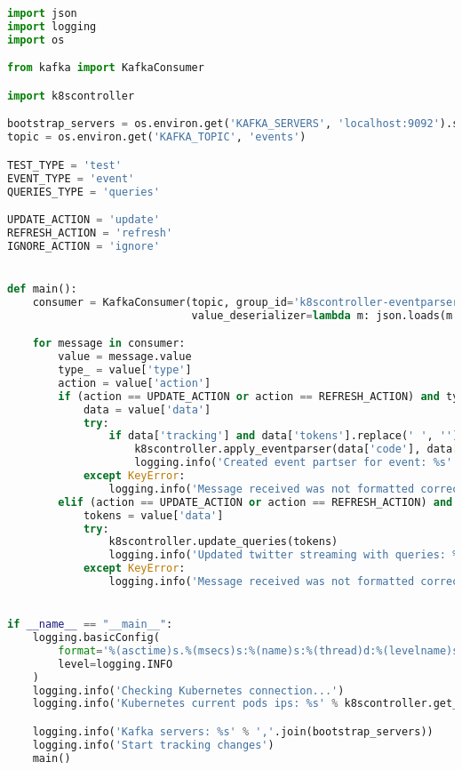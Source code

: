 \begin{lstlisting}[language=Python]
import json
import logging
import os

from kafka import KafkaConsumer

import k8scontroller

bootstrap_servers = os.environ.get('KAFKA_SERVERS', 'localhost:9092').split(',')
topic = os.environ.get('KAFKA_TOPIC', 'events')

TEST_TYPE = 'test'
EVENT_TYPE = 'event'
QUERIES_TYPE = 'queries'

UPDATE_ACTION = 'update'
REFRESH_ACTION = 'refresh'
IGNORE_ACTION = 'ignore'


def main():
    consumer = KafkaConsumer(topic, group_id='k8scontroller-eventparser', bootstrap_servers=bootstrap_servers,
                             value_deserializer=lambda m: json.loads(m.decode('utf-8')))

    for message in consumer:
        value = message.value
        type_ = value['type']
        action = value['action']
        if (action == UPDATE_ACTION or action == REFRESH_ACTION) and type_ == EVENT_TYPE:
            data = value['data']
            try:
                if data['tracking'] and data['tokens'].replace(' ', '').replace(',', ''):
                    k8scontroller.apply_eventparser(data['code'], data['tokens'])
                    logging.info('Created event partser for event: %s' % data['code'])
            except KeyError:
                logging.info('Message received was not formatted correctly. Message:\n %s' % data)
        elif (action == UPDATE_ACTION or action == REFRESH_ACTION) and type_ == QUERIES_TYPE:
            tokens = value['data']
            try:
                k8scontroller.update_queries(tokens)
                logging.info('Updated twitter streaming with queries: %s' % tokens)
            except KeyError:
                logging.info('Message received was not formatted correctly. Message:\n %s' % value)


if __name__ == "__main__":
    logging.basicConfig(
        format='%(asctime)s.%(msecs)s:%(name)s:%(thread)d:%(levelname)s:%(process)d:%(message)s',
        level=logging.INFO
    )
    logging.info('Checking Kubernetes connection...')
    logging.info('Kubernetes current pods ips: %s' % k8scontroller.get_pod_ips())

    logging.info('Kafka servers: %s' % ','.join(bootstrap_servers))
    logging.info('Start tracking changes')
    main()
\end{lstlisting}

